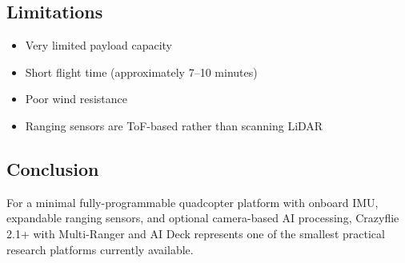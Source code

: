 \documentclass[a4paper]{article}
\begin{document}
        \subsection{Limitations}
            
            \begin{itemize}
                \item Very limited payload capacity
                \item Short flight time (approximately 7–10 minutes)
                \item Poor wind resistance
                \item Ranging sensors are ToF-based rather than scanning LiDAR
            \end{itemize}
        
        \subsection{Conclusion}
            
            For a minimal fully-programmable quadcopter platform with onboard IMU, expandable ranging sensors, and optional camera-based AI processing, Crazyflie 2.1+ with Multi-Ranger and AI Deck represents one of the smallest practical research platforms currently available.
\end{document}
